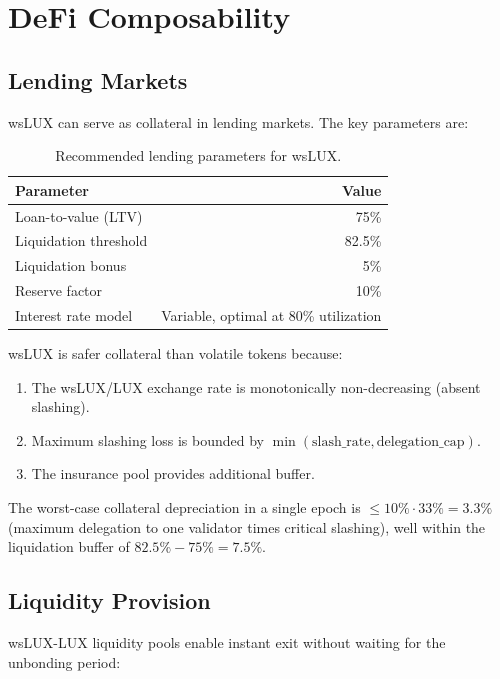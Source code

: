 \section{DeFi Composability}
\label{sec:defi}

\subsection{Lending Markets}

wsLUX can serve as collateral in lending markets. The key parameters are:

\begin{table}[H]
\centering
\caption{Recommended lending parameters for wsLUX.}
\label{tab:lending}
\begin{tabular}{lr}
\toprule
\textbf{Parameter} & \textbf{Value} \\
\midrule
Loan-to-value (LTV) & 75\% \\
Liquidation threshold & 82.5\% \\
Liquidation bonus & 5\% \\
Reserve factor & 10\% \\
Interest rate model & Variable, optimal at 80\% utilization \\
\bottomrule
\end{tabular}
\end{table}

\begin{proposition}
wsLUX is safer collateral than volatile tokens because:
\begin{enumerate}
    \item The wsLUX/LUX exchange rate is monotonically non-decreasing (absent slashing).
    \item Maximum slashing loss is bounded by $\min(\text{slash\_rate}, \text{delegation\_cap})$.
    \item The insurance pool provides additional buffer.
\end{enumerate}
The worst-case collateral depreciation in a single epoch is $\leq 10\% \cdot 33\% = 3.3\%$ (maximum delegation to one validator times critical slashing), well within the liquidation buffer of $82.5\% - 75\% = 7.5\%$.
\end{proposition}

\subsection{Liquidity Provision}

wsLUX-LUX liquidity pools enable instant exit without waiting for the unbonding period:

